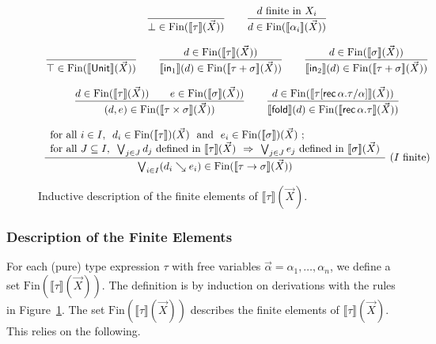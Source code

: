 \documentclass[%
  a4paper,
  UKenglish,
  cleveref,
  autoref,
  thm-restate,
  numberwithinsect,
]{lipics-v2021}
\newcommand\sle\subseteq
\newcommand\imp\Rightarrow
\newcommand\I[1]{\llbracket #1 \rrbracket} %
\newcommand\term[1]{\mathsf{#1}}
\newcommand\type[1]{\term{#1}}
\newcommand\inj{\mathop{\term{in}}}
\newcommand\fold{\mathop{\term{fold}}}
\newcommand\arrow\to
\newcommand\Unit{\type{Unit}}
\newcommand\rec{\mathop{\type{rec}}}	%
\newcommand\TV{\alpha}		%
\newcommand\PT{\tau}		%
\newcommand\PTbis{\sigma}	%
\newcommand\step{\searrow}
\newcommand\Fin{\mathrm{Fin}}	%
\begin{document}
\begin{figure}[t!]
\centering
\(
\begin{array}{c}
%
\dfrac{}
  {\bot \in \Fin(\I\PT(\vec X))}  
%
\qquad
%
\dfrac{\text{$d$ finite in $X_i$}}
  {d \in \Fin(\I{\TV_i}(\vec X))}
%
\\\\
%
\dfrac{}
  {\top \in \Fin(\I\Unit(\vec X))}
%
\qquad
%
\dfrac{d \in \Fin(\I\PT(\vec X))}
  {\I{\inj_1}(d) \in \Fin(\I{\PT + \PTbis}(\vec X))}
%
\qquad
%
\dfrac{d \in \Fin(\I\PTbis(\vec X))}
  {\I{\inj_2}(d) \in \Fin(\I{\PT + \PTbis}(\vec X))}
%
\\\\
%
\dfrac{d \in \Fin(\I\PT(\vec X))
  \qquad
  e \in \Fin(\I\PTbis(\vec X))}
  {(d,e) \in \Fin(\I{\PT \times \PTbis}(\vec X))}
%
\qquad
%
\dfrac{d \in \Fin(\I{\PT[\rec\TV.\PT/\TV]}(\vec X))}
  {\I\fold(d) \in \Fin(\I{\rec\TV.\PT}(\vec X))}
%
\\\\
%
\dfrac{\begin{array}{l}
  \text{for all $i \in I$,~
  $d_i \in \Fin(\I{\PT})(\vec X)$
  ~and~
  $e_i \in \Fin(\I{\PTbis})(\vec X)$ \@;}
  \\
  \text{for all $J \sle I$,~
  $\bigvee_{j \in J} d_j$ defined in $\I{\PT}(\vec X)$
  ~$\imp$~
  $\bigvee_{j \in J} e_j$ defined in $\I{\PTbis}(\vec X)$}
  \end{array}}
  {\bigvee_{i \in I}(d_i \step e_i) \in \Fin(\I{\PT \arrow \PTbis}(\vec X))}
~(\text{$I$ finite})
%
\end{array}
\)
\caption{Inductive description of the finite elements of $\I\PT(\vec X)$.%
\label{fig:proof:sem:finelt}}
\end{figure}

\subsubsection{Description of the Finite Elements}
\label{sec:proof:sem:pure:finite}

For each (pure) type expression $\PT$
with free variables $\vec\TV = \TV_1,\dots,\TV_n$,
we define a set $\Fin(\I{\PT}(\vec X))$.
The definition is by induction on derivations with
the rules in Figure~\ref{fig:proof:sem:finelt}.
The set $\Fin(\I{\PT}(\vec X))$
describes the finite elements of $\I{\PT}(\vec X)$.
This relies on the following.
\end{document}
